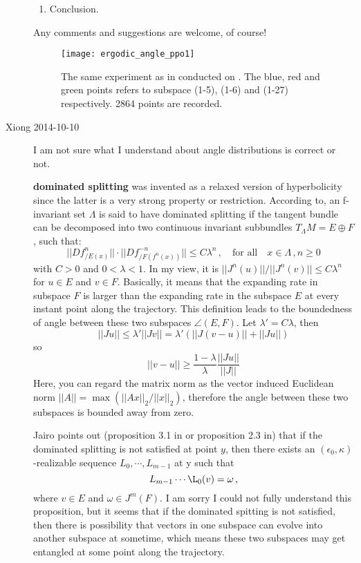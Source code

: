\begin{description}
\begin{enumerate}
\item Conclusion.
\end{enumerate}

Any comments and suggestions are welcome, of course!
\begin{figure}[h]
  \centering
  \texttt{[image: ergodic\_angle\_ppo1]}
  \caption{The same experiment as in
   conducted on . The
  blue, red and green points refers to subspace (1-5), (1-6)
  and (1-27) respectively. 2864 points are recorded.
}
  \label{fig:ergodic_angle_ppo1}
\end{figure}

\item[Xiong 2014-10-10]
  I am not sure what I understand about angle distributions is
  correct or not.

  \textbf{dominated splitting} was invented as a relaxed version of
  hyperbolicity since the latter is a very strong property or restriction.
  According to, an f-invariant set
  $\Lambda$ is said to have dominated splitting if the tangent bundle can
  be decomposed into two continuous invariant subbundles
  $T_\Lambda M = E \oplus F$, such that:
  \[
  ||Df^{n}_{/E(x)}||\cdot||Df^{-n}_{/F(f^n(x))}|| \le C\lambda^n \,,\quad
  \text{for all} \quad x\in\Lambda\,, n\ge 0
  \]
  with $C>0$ and $0<\lambda<1$. In my view, it is
  $||J^n(u)||/||J^n(v)||\le C\lambda^n$ for $u\in E$ and $v\in F$.
  Basically, it means that the expanding rate in subspace $F$ is larger
  than the expanding rate in the subspace $E$ at every instant point along
  the trajectory. This definition leads to the boundedness of angle
  between these two subspaces $\angle (E, F)$. Let $\lambda'=C\lambda$, then
  \[
  ||Ju|| \le \lambda' ||Jv|| = \lambda'(||J(v-u)||+||Ju||)
  \]
  so
  \[
  ||v-u|| \ge \frac{1-\lambda}{\lambda}\frac{||Ju||}{||J||}
  \]
  Here, you can regard the matrix norm as the vector induced Euclidean
  norm $||A||=\max(||Ax||_2/||x||_2)$, therefore the angle between these
  two subspaces is bounded away from zero.

  Jairo points out (proposition 3.1 in or proposition 2.3
  in) that if the dominated splitting is not satisfied at
  point $y$, then there exists an $(\epsilon_0,\kappa)$-realizable sequence
  ${L_0, \cdots, L_{m-1}}$ at y such that
  \[
  L_{m-1}\cdots\L_0(v) = \omega
  \,,
  \]
  where $v\in E$ and $\omega\in J^{m}(F)$. I am sorry I could not fully
  understand this proposition, but it seems that if the dominated
  spitting is not satisfied, then there is possibility that vectors in
  one subspace can evolve into another subspace at sometime, which means
  these two subspaces may get entangled at some point along the trajectory.


\end{description}
